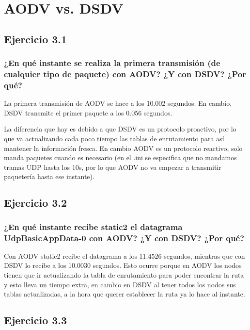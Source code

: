 \chapter{AODV vs. DSDV}
\label{chap:aodvdsdv}

\section{Ejercicio 3.1}

\subsection{¿En qué instante se realiza la primera transmisión (de cualquier tipo de paquete) con AODV? ¿Y con DSDV?
¿Por qué?}

La primera transmisión de AODV se hace a los 10.002 segundos. En cambio, DSDV transmite el primer paquete a los 0.056 segundos.

La diferencia que hay es debido a que DSDV es un protocolo proactivo, por lo que va actualizando cada poco tiempo las tablas de enrutamiento para así mantener la información fresca. En cambio AODV es un protocolo reactivo, solo manda paquetes cuando es necesario (en el .ini se especifica que no mandamos tramas UDP hasta los 10s, por lo que AODV no va empezar a transmitir paquetería hasta ese instante).

\section{Ejercicio 3.2}

\subsection{¿En qué instante recibe static2 el datagrama UdpBasicAppData-0 con AODV? ¿Y con DSDV? ¿Por qué?}

Con AODV static2 recibe el datagrama a los 11.4526 segundos, mientras que con DSDV lo recibe a los 10.0030 segundos. Esto ocurre porque en AODV los nodos tienen que ir actualizando la tabla de enrutamiento para poder encontrar la ruta y esto lleva un tiempo extra, en cambio en DSDV al tener todos los nodos sus tablas actualizadas, a la hora que querer establecer la ruta ya lo hace al instante.


\section{Ejercicio 3.3}

